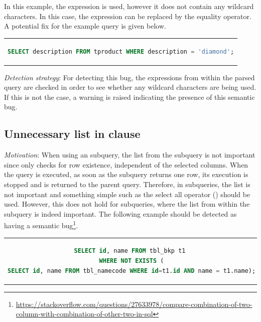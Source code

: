 In this example, the  expression is used, however it does not contain any wildcard characters. In this case, the  expression can be replaced by the equality operator. A potential fix for the example query is given below.

\begin{center}
\begin{tabular}{c}
\begin{lstlisting}[language=SQL]
SELECT description FROM tproduct WHERE description = 'diamond';
\end{lstlisting}
\end{tabular}
\end{center}

\noindent \emph{Detection strategy}: For detecting this bug, the  expressions from within the parsed query are checked in order to see whether any wildcard characters are being used. If this is not the case, a warning is raised indicating the presence of this semantic bug.

\subsection{Unnecessary  list in  clause}
\emph{Motivation}: When using an  subquery, the  list from the subquery is not important since  only checks for row existence, independent of the selected columns. When the query is executed, as soon as the  subquery returns one row, its execution is stopped and  is returned to the parent query. Therefore, in  subqueries, the  list is not important and something simple such as the select all operator (\sql{*}) should be used. However, this does not hold for  subqueries, where the  list from within the subquery is indeed important. The following example should be detected as having a semantic bug\footnote{\url{https://stackoverflow.com/questions/27633978/compare-combination-of-two-column-with-combination-of-other-two-in-sql}}.

\begin{center}
\begin{tabular}{c}
\begin{lstlisting}[language=SQL]
SELECT id, name FROM tbl_bkp t1 
WHERE NOT EXISTS (
SELECT id, name FROM tbl_namecode WHERE id=t1.id AND name = t1.name);
\end{lstlisting}
\end{tabular}
\end{center}

